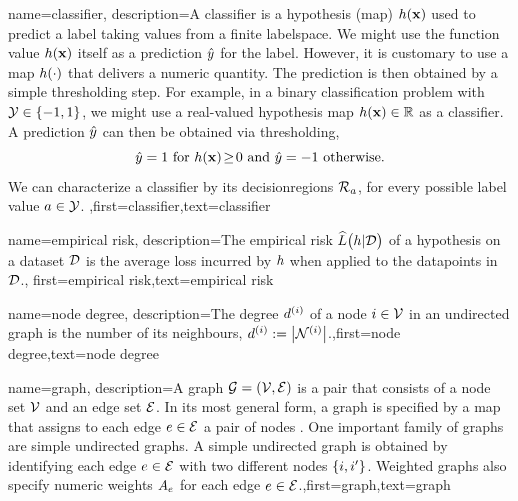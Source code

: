 {
	name={classifier},
	description={A classifier is a \gls{hypothesis} (map) $h({\bf x})$ 
		used to predict a \gls{label} taking values from a finite \gls{labelspace}. We might use the 
		function value $h({\bf x})$ itself as a \gls{prediction} $\hat{y}$ for 
		the \gls{label}. However, it is customary to use a map $h(\cdot)$ that delivers 
		a numeric quantity. The \gls{prediction} is then obtained by a simple thresholding step. 
		For example, in a binary \gls{classification} problem with \label{labelspace} $\mathcal{Y} \in  \{ -1,1\}$, 
		we might use a real-valued \gls{hypothesis} map $h({\bf x}) \in \mathbb{R}$ 
		as a classifier. A \gls{prediction} $\hat{y}$ can then be obtained via thresholding,  
		 \begin{equation} 
		 	\label{equ_def_threshold_bin_classifier_dict}
		 	\hat{y} =1   \mbox{ for } h({\bf x})\!\geq\!0 \mbox{ and } 	\hat{y} =-1  \mbox{ otherwise.}
	 		\end{equation}
 		We can characterize a classifier by its \gls{decisionregion}s $\mathcal{R}_{a}$, for 
 		every possible \gls{label} value $a \in \mathcal{Y}$. },first={classifier},text={classifier} 
}

{name={empirical risk},
  description={The empirical risk $\widehat{L}\big(h|\mathcal{D}\big)$ 
  	of a \gls{hypothesis} on a \gls{dataset} $\mathcal{D}$ is the average \gls{loss} incurred 
  	by $h$ when applied to the \gls{datapoint}s in $\mathcal{D}$.},
  first={empirical risk},text={empirical risk} 
}

{name={node degree},
	description={The degree $d^{(i)}$ of a node $i \in \mathcal{V}$ 
		in an undirected \gls{graph} is the number of its \gls{neighbours}, $d^{(i)} := \big|\mathcal{N}^{(i)}\big|$.},first={node degree},text={node degree} 
}

{name={graph},
	description={A graph $\mathcal{G} = \left( \mathcal{V},\mathcal{E} \right)$ is a pair that consists of 
		a node set $\mathcal{V}$ and an edge set $\mathcal{E}$. In its most general form, a graph is 
		specified by a map that assigns to each edge $e \in \mathcal{E}$ a pair of nodes \cite{RockNetworks}. 
		One important family of graphs are simple undirected graphs. A simple undirected graph 
		is obtained by identifying each edge $e \in \mathcal{E}$ with two different nodes $\{i,i'\}$. 
		Weighted graphs also specify numeric weights $A_{e}$ for each 
		edge $e \in \mathcal{E}$.},first={graph},text={graph} 
}



